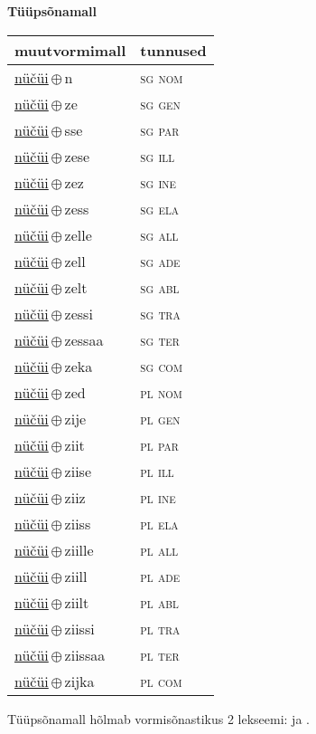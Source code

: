 

\vspace{3.5em}
\noindent \begin{minipage}{\textwidth}
\noindent \textbf{Tüüpsõnamall \,}\\

\begin{sideways}
\begin{tabular}{l l}
muutvormimall & tunnused \\
\hline
\underline{nüčüi}\,$\oplus$\,n & \textsc{ sg nom } \\
\underline{nüčüi}\,$\oplus$\,ze & \textsc{ sg gen } \\
\underline{nüčüi}\,$\oplus$\,sse & \textsc{ sg par } \\
\underline{nüčüi}\,$\oplus$\,zese & \textsc{ sg ill } \\
\underline{nüčüi}\,$\oplus$\,zez & \textsc{ sg ine } \\
\underline{nüčüi}\,$\oplus$\,zess & \textsc{ sg ela } \\
\underline{nüčüi}\,$\oplus$\,zelle & \textsc{ sg all } \\
\underline{nüčüi}\,$\oplus$\,zell & \textsc{ sg ade } \\
\underline{nüčüi}\,$\oplus$\,zelt & \textsc{ sg abl } \\
\underline{nüčüi}\,$\oplus$\,zessi & \textsc{ sg tra } \\
\underline{nüčüi}\,$\oplus$\,zessaa & \textsc{ sg ter } \\
\underline{nüčüi}\,$\oplus$\,zeka & \textsc{ sg com } \\
\underline{nüčüi}\,$\oplus$\,zed & \textsc{ pl nom } \\
\underline{nüčüi}\,$\oplus$\,zije & \textsc{ pl gen } \\
\underline{nüčüi}\,$\oplus$\,ziit & \textsc{ pl par } \\
\underline{nüčüi}\,$\oplus$\,ziise & \textsc{ pl ill } \\
\underline{nüčüi}\,$\oplus$\,ziiz & \textsc{ pl ine } \\
\underline{nüčüi}\,$\oplus$\,ziiss & \textsc{ pl ela } \\
\underline{nüčüi}\,$\oplus$\,ziille & \textsc{ pl all } \\
\underline{nüčüi}\,$\oplus$\,ziill & \textsc{ pl ade } \\
\underline{nüčüi}\,$\oplus$\,ziilt & \textsc{ pl abl } \\
\underline{nüčüi}\,$\oplus$\,ziissi & \textsc{ pl tra } \\
\underline{nüčüi}\,$\oplus$\,ziissaa & \textsc{ pl ter } \\
\underline{nüčüi}\,$\oplus$\,zijka & \textsc{ pl com } \\
\end{tabular}
\end{sideways}
\label{tab:tüüpsõnamall-nüčüin}

\end{minipage}

 
\vspace{1em}
\noindent Tüüpsõnamall  hõlmab vormisõnastikus 2 lekseemi:  ja .
